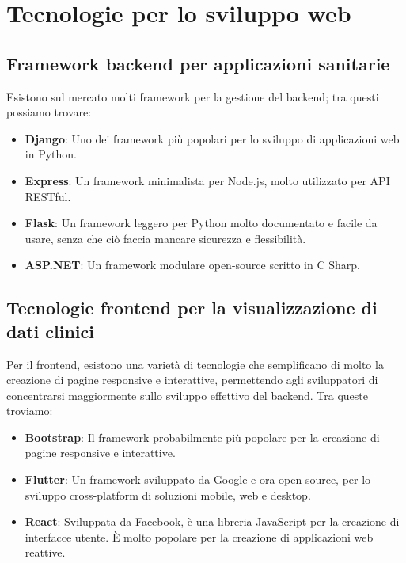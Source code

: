 \documentclass[12pt,a4paper,oneside]{report}
\begin{document}
\section{Tecnologie per lo sviluppo web}

\subsection{Framework backend per applicazioni sanitarie}
Esistono sul mercato molti framework per la gestione del backend; tra questi possiamo trovare\cite{geeksforgeeks}:

\begin{itemize}
    \item \textbf{Django}: Uno dei framework più popolari per lo sviluppo di applicazioni web in Python.
  \item \textbf{Express}: Un framework minimalista per Node.js, molto utilizzato per API RESTful.
    \item \textbf{Flask}: Un framework leggero per Python molto documentato e facile da usare, senza che ciò faccia mancare sicurezza e flessibilità.
  \item \textbf{ASP.NET}: Un framework modulare open-source scritto in C Sharp.
\end{itemize}

\subsection{Tecnologie frontend per la visualizzazione di dati clinici}
Per il frontend, esistono una varietà di tecnologie che semplificano di molto la creazione di pagine responsive e interattive, permettendo agli sviluppatori di concentrarsi maggiormente sullo sviluppo effettivo del backend. Tra queste troviamo:

\begin{itemize}
    \item \textbf{Bootstrap}: Il framework probabilmente più popolare per la creazione di pagine responsive e interattive. \cite{bootstrap}
    \item \textbf{Flutter}: Un framework sviluppato da Google e ora open-source, per lo sviluppo cross-platform di soluzioni mobile, web e desktop. \cite{flutter}
    \item \textbf{React}: Sviluppata da Facebook, è una libreria JavaScript per la creazione di interfacce utente. È molto popolare per la creazione di applicazioni web reattive. \cite{react}
\end{itemize}
\end{document}
